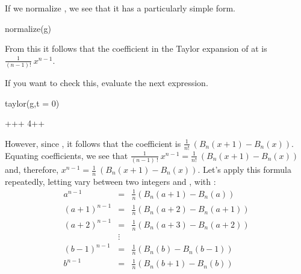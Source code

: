 {{{{{{{{{{{{{{{{%
\begin{xtc}
\begin{xtccomment}
If we normalize , we see that it has a particularly simple form.
\end{xtccomment}
\begin{spadsrc}
normalize(g) 
\end{spadsrc}
\begin{TeXOutput}
\begin{fricasmath}{8}
\TIMES {}%
\end{fricasmath}
\end{TeXOutput}
\end{xtc}
%
From this it follows that the 
coefficient in the Taylor expansion of
 at  is
$\frac{1}{(n-1)!}\:x^{n-1}$.
\begin{xtc}
\begin{xtccomment}
If you want to check this, evaluate the next expression.
\end{xtccomment}
\begin{spadsrc}
taylor(g,t = 0) 
\end{spadsrc}
\begin{TeXOutput}
\begin{fricasmath}{9}
+\TIMES {}+\TIMES {}+\TIMES \SUPER%
{}{4}+\TIMES {}+%
%
\end{fricasmath}
\end{TeXOutput}
\end{xtc}
%
However, since , it follows that the
 coefficient is
$\frac{1}{n!}\:(B_n(x+1)-B_n(x))$.
Equating coefficients, we see that
$\frac{1}{(n-1)\:!}\:x^{n-1} = \frac{1}{n!}\:(B_n(x + 1) - B_n(x))$
and, therefore,
$x^{n-1} = {\frac{1}{n}}\:(B_n(x + 1) - B_n(x))$.
Let's apply this formula repeatedly, letting  vary between two
integers  and , with :
%
\begin{displaymath}
\begin{array}{lcl}
  a^{n-1}       & = & \frac{1}{n}   (B_n(a + 1) - B_n(a))       \\
  (a + 1)^{n-1} & = & \frac{1}{n}   (B_n(a + 2) - B_n(a + 1))   \\
  (a + 2)^{n-1} & = & \frac{1}{n}   (B_n(a + 3) - B_n(a + 2))   \\
  & \vdots &                                                    \\
  (b - 1)^{n-1} & = & \frac{1}{n}   (B_n(b) - B_n(b - 1))       \\
  b^{n-1}       & = & \frac{1}{n}   (B_n(b + 1) - B_n(b))
\end{array}
\end{displaymath}

}}}}}}}}}}}}}}}}
